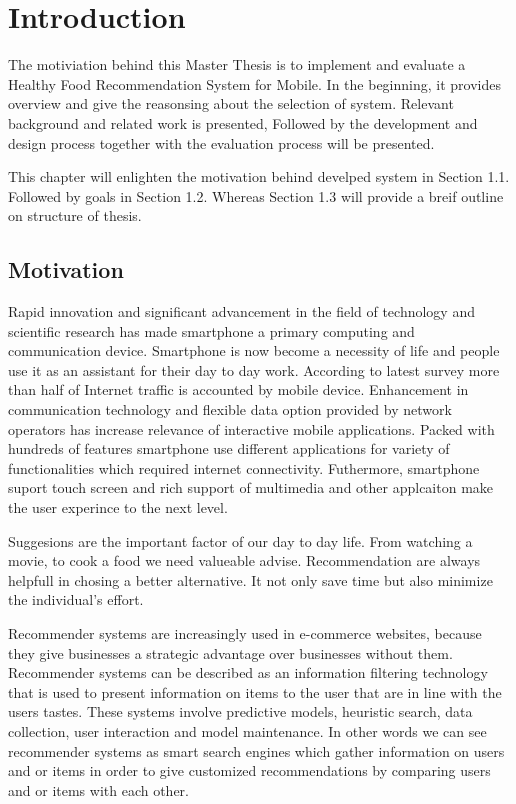 \chapter{Introduction}
\setcounter{page}{1}%
\thispagestyle{empty}

The motiviation behind this Master Thesis is to implement and evaluate a Healthy Food Recommendation System for Mobile. In the beginning, it provides overview and give the reasonsing about the selection of system. Relevant background and related work is presented, Followed by the development and design process together with the evaluation process will be presented. \newline

This chapter will enlighten the motivation behind develped system in Section 1.1. Followed by goals in Section 1.2. Whereas Section 1.3 will provide a breif outline on structure of thesis.

\section{Motivation}\label{motivation}

Rapid innovation and significant advancement in the field of technology and scientific research has made smartphone a primary computing and communication device. Smartphone is now become a necessity of life and people use it as an assistant for their day to day work. According to latest survey more than half of Internet traffic is accounted by mobile device. Enhancement in communication technology and flexible data option provided by network operators has increase relevance of interactive mobile applications. Packed with hundreds of features smartphone use different applications for variety of functionalities which required internet connectivity. Futhermore, smartphone suport touch screen and rich support of multimedia and other applcaiton make the user experince to the next level.\newline

Suggesions are the important factor of our day to day life. From watching a movie, to cook a food we need valueable advise. Recommendation are always helpfull in chosing a better alternative. It not only save time but also minimize the individual's effort.\newline


Recommender systems are increasingly used in e-commerce websites, because they give businesses a strategic advantage over businesses without them. Recommender systems can be described as an information filtering technology that is used to present information on items to the user that are in line with the users tastes. These systems involve predictive models, heuristic search, data collection, user interaction and model maintenance. In other words we can see recommender systems as smart search engines which gather information on users and or items in order to give customized recommendations by comparing users and or items with each other.\newline

